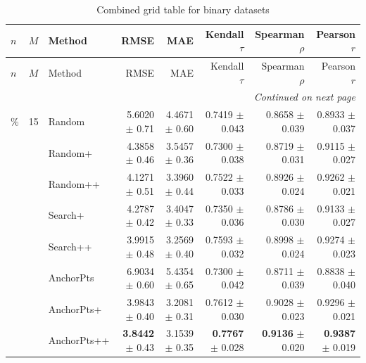 \footnotesize
\setlength{\tabcolsep}{2pt}
\renewcommand{\arraystretch}{1.05}
\setlength{\LTpre}{0pt}
\setlength{\LTpost}{0pt}
\setlength{\LTleft}{\fill}
\setlength{\LTright}{\fill}
\begin{longtable}{llp{}rrrrr}
\caption{Combined grid table for binary datasets}\label{tab:combined_grid_binary}\\
\toprule
$n$ & $M$ & Method & RMSE & MAE & Kendall $\tau$ & Spearman $\rho$ & Pearson $r$ \\
\midrule
\endfirsthead
\toprule
$n$ & $M$ & Method & RMSE & MAE & Kendall $\tau$ & Spearman $\rho$ & Pearson $r$ \\
\midrule
\endhead
\midrule
\multicolumn{8}{r}{\emph{Continued on next page}} \\
\midrule
\endfoot
\bottomrule
\endlastfoot
5\% & 15 & Random & 5.6020 {\scriptsize $\pm$ 0.71} & 4.4671 {\scriptsize $\pm$ 0.60} & 0.7419 {\scriptsize $\pm$ 0.043} & 0.8658 {\scriptsize $\pm$ 0.039} & 0.8933 {\scriptsize $\pm$ 0.037} \\
 &  & Random+ & 4.3858 {\scriptsize $\pm$ 0.46} & 3.5457 {\scriptsize $\pm$ 0.36} & 0.7300 {\scriptsize $\pm$ 0.038} & 0.8719 {\scriptsize $\pm$ 0.031} & 0.9115 {\scriptsize $\pm$ 0.027} \\
 &  & Random++ & 4.1271 {\scriptsize $\pm$ 0.51} & 3.3960 {\scriptsize $\pm$ 0.44} & 0.7522 {\scriptsize $\pm$ 0.033} & 0.8926 {\scriptsize $\pm$ 0.024} & 0.9262 {\scriptsize $\pm$ 0.021} \\
 &  & Search+ & 4.2787 {\scriptsize $\pm$ 0.42} & 3.4047 {\scriptsize $\pm$ 0.33} & 0.7350 {\scriptsize $\pm$ 0.036} & 0.8786 {\scriptsize $\pm$ 0.030} & 0.9133 {\scriptsize $\pm$ 0.027} \\
 &  & Search++ & 3.9915 {\scriptsize $\pm$ 0.48} & 3.2569 {\scriptsize $\pm$ 0.40} & 0.7593 {\scriptsize $\pm$ 0.032} & 0.8998 {\scriptsize $\pm$ 0.024} & 0.9274 {\scriptsize $\pm$ 0.023} \\
 &  & AnchorPts & 6.9034 {\scriptsize $\pm$ 0.60} & 5.4354 {\scriptsize $\pm$ 0.65} & 0.7300 {\scriptsize $\pm$ 0.042} & 0.8711 {\scriptsize $\pm$ 0.039} & 0.8838 {\scriptsize $\pm$ 0.040} \\
 &  & AnchorPts+ & 3.9843 {\scriptsize $\pm$ 0.40} & 3.2081 {\scriptsize $\pm$ 0.31} & 0.7612 {\scriptsize $\pm$ 0.030} & 0.9028 {\scriptsize $\pm$ 0.023} & 0.9296 {\scriptsize $\pm$ 0.021} \\
 &  & AnchorPts++ & \textbf{3.8442} {\scriptsize $\pm$ 0.43} & 3.1539 {\scriptsize $\pm$ 0.35} & \textbf{0.7767} {\scriptsize $\pm$ 0.028} & \textbf{0.9136} {\scriptsize $\pm$ 0.020} & \textbf{0.9387} {\scriptsize $\pm$ 0.019} \\

\end{longtable}
